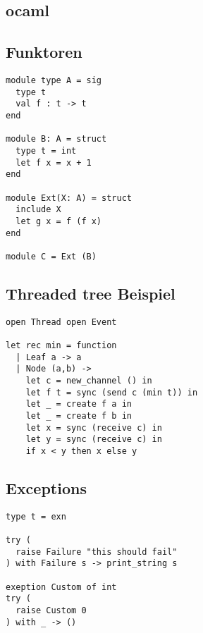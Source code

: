 \documentclass[a4paper,8pt,landscape]{extarticle}
\begin{document}
\begin{multicols*}{3}
    
    \section{ocaml}
    \subsection{Funktoren}
    \begin{verbatim}
module type A = sig
  type t
  val f : t -> t
end

module B: A = struct
  type t = int
  let f x = x + 1
end

module Ext(X: A) = struct
  include X
  let g x = f (f x)
end

module C = Ext (B)
    \end{verbatim}
    \subsection{Threaded tree Beispiel}
    \begin{verbatim}
open Thread open Event

let rec min = function
  | Leaf a -> a
  | Node (a,b) ->
    let c = new_channel () in
    let f t = sync (send c (min t)) in
    let _ = create f a in
    let _ = create f b in
    let x = sync (receive c) in
    let y = sync (receive c) in
    if x < y then x else y
    \end{verbatim}
    \subsection{Exceptions}
    \begin{verbatim}
type t = exn

try (
  raise Failure "this should fail"
) with Failure s -> print_string s

exeption Custom of int
try (
  raise Custom 0
) with _ -> ()
    \end{verbatim}
    
  \end{multicols*}
\end{document}
